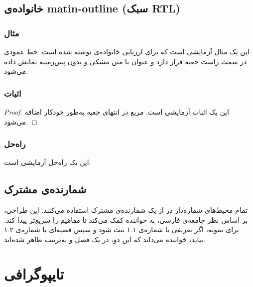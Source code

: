 \documentclass{matinbook}
\begin{document}
\section{خانواده‌ی matin-outline (سبک RTL)}
\label{sec:box-outline}

\subsection{مثال}

\begin{example}
    این یک مثال آزمایشی است که برای ارزیابی خانواده‌ی
     نوشته شده است. خط عمودی در سمت
    راست جعبه قرار دارد و عنوان با متن مشکی و بدون
    پس‌زمینه نمایش داده می‌شود.
    \label{ex:sample}
\end{example}

\subsection{اثبات}

\begin{proof}
    این یک اثبات آزمایشی است. مربع  در انتهای
    جعبه به‌طور خودکار اضافه می‌شود.
\end{proof}

\subsection{راه‌حل}

\begin{solution}
    این یک راه‌حل آزمایشی است.
\end{solution}

\section{شمارنده‌ی مشترک}
\label{sec:box-counter}

تمام محیط‌های شماره‌دار در  از یک شمارنده‌ی
مشترک استفاده می‌کنند. این طراحی، بر اساس نظر جامعه‌ی
 فارسی، به خواننده کمک می‌کند تا مفاهیم را
سریع‌تر پیدا کند. برای نمونه، اگر تعریفی با شماره‌ی ۱.۱
ثبت شود و سپس قضیه‌ای با شماره‌ی ۱.۲ بیاید، خواننده
می‌داند که این دو، در یک فصل و به‌ترتیب ظاهر شده‌اند.

\chapter{تایپوگرافی}
\label{chap:typography}
\end{document}
